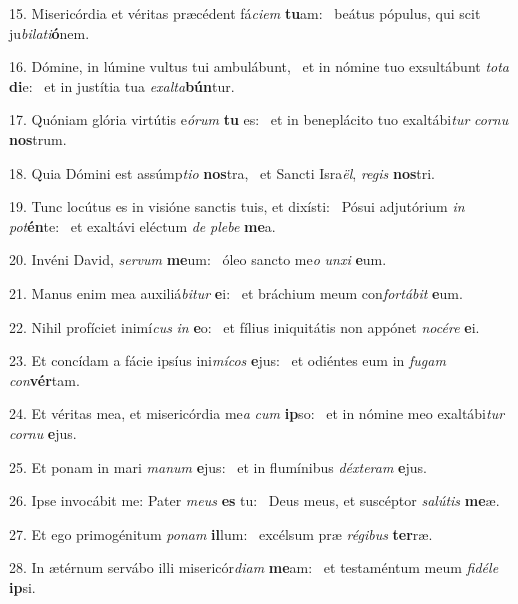 15. Misericórdia et véritas præcédent fá\textit{ci}\textit{em} \textbf{tu}am: \ast\  beátus pópulus, qui scit ju\textit{bi}\textit{la}\textit{ti}\textbf{ó}nem.\

16. Dómine, in lúmine vultus tui ambulábunt, \dag\  et in nómine tuo exsultábunt \textit{to}\textit{ta} \textbf{di}e: \ast\  et in justítia tua \textit{ex}\textit{al}\textit{ta}\textbf{bún}tur.\

17. Quóniam glória virtútis e\textit{ó}\textit{rum} \textbf{tu} es: \ast\  et in beneplácito tuo exaltábi\textit{tur} \textit{cor}\textit{nu} \textbf{nos}trum.\

18. Quia Dómini est assúmp\textit{ti}\textit{o} \textbf{nos}tra, \ast\  et Sancti Isra\textit{ël}, \textit{re}\textit{gis} \textbf{nos}tri.\

19. Tunc locútus es in visióne sanctis tuis, et dixísti: \dag\  Pósui adjutórium \textit{in} \textit{pot}\textbf{én}te: \ast\  et exaltávi eléctum \textit{de} \textit{ple}\textit{be} \textbf{me}a.\

20. Invéni David, \textit{ser}\textit{vum} \textbf{me}um: \ast\  óleo sancto me\textit{o} \textit{un}\textit{xi} \textbf{e}um.\

21. Manus enim mea auxiliá\textit{bi}\textit{tur} \textbf{e}i: \ast\  et bráchium meum con\textit{for}\textit{tá}\textit{bit} \textbf{e}um.\

22. Nihil profíciet inimí\textit{cus} \textit{in} \textbf{e}o: \ast\  et fílius iniquitátis non appónet \textit{no}\textit{cé}\textit{re} \textbf{e}i.\

23. Et concídam a fácie ipsíus ini\textit{mí}\textit{cos} \textbf{e}jus: \ast\  et odiéntes eum in \textit{fu}\textit{gam} \textit{con}\textbf{vér}tam.\

24. Et véritas mea, et misericórdia me\textit{a} \textit{cum} \textbf{ip}so: \ast\  et in nómine meo exaltábi\textit{tur} \textit{cor}\textit{nu} \textbf{e}jus.\

25. Et ponam in mari \textit{ma}\textit{num} \textbf{e}jus: \ast\  et in flumínibus \textit{déx}\textit{te}\textit{ram} \textbf{e}jus.\

26. Ipse invocábit me: Pater \textit{me}\textit{us} \textbf{es} tu: \ast\  Deus meus, et suscéptor \textit{sa}\textit{lú}\textit{tis} \textbf{me}æ.\

27. Et ego primogénitum \textit{po}\textit{nam} \textbf{il}lum: \ast\  excélsum præ \textit{ré}\textit{gi}\textit{bus} \textbf{ter}ræ.\

28. In ætérnum servábo illi misericór\textit{di}\textit{am} \textbf{me}am: \ast\  et testaméntum meum \textit{fi}\textit{dé}\textit{le} \textbf{ip}si.\

